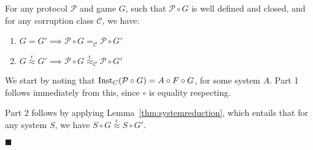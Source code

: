 \begin{theorem}
  For any protocol $\mathcal{P}$ and game $G$, such that $\mathcal{P} \circ G$
  is well defined and closed, and for any corruption class $\mathcal{C}$, we have:
  \begin{enumerate}
    \item $G = G' \implies \mathcal{P} \circ G =_{\mathcal{C}} \mathcal{P} \circ G'$
    \item $G \overset{\epsilon}{\approx} G' \implies \mathcal{P} \circ G \overset{\epsilon}{\approx}_{\mathcal{C}} \mathcal{P} \circ G'$
  \end{enumerate}
  
 We start by noting that $\text{Inst}_C(\mathcal{P} \circ G) = A \circ F \circ G$,
for some system $A$.
Part 1 follows immediately from this, since $\circ$ is equality respecting.

Part 2 follows by applying Lemma~\ref{thm:systemreduction},
which entails that for any system $S$, we have $S \circ G \overset{\epsilon}{\approx} S \circ G'$.

$\blacksquare$
\end{theorem}

